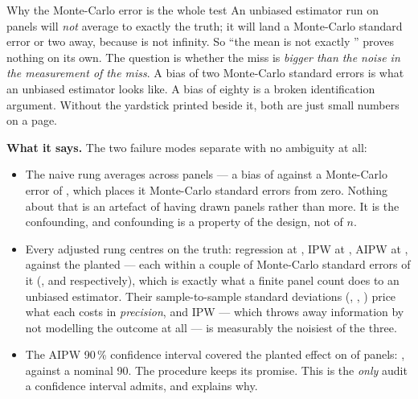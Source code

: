 \begin{intuition}{Why the Monte-Carlo error is the whole test}
An unbiased estimator run on \nbZeroNSeeds{} panels will \emph{not} average to exactly the
truth; it will land a Monte-Carlo standard error or two away, because \nbZeroNSeeds{} is not
infinity. So ``the mean is not exactly \eur{\nbZeroTrueDag}'' proves nothing on its own. The
question is whether the miss is \emph{bigger than the noise in the measurement of the miss}. A
bias of two Monte-Carlo standard errors is what an unbiased estimator looks like. A bias of
eighty is a broken identification argument. Without the yardstick printed beside it, both are
just small numbers on a page.
\end{intuition}

\textbf{What it says.} The two failure modes separate with no ambiguity at all:

\begin{itemize}[leftmargin=*]
  \item The naive rung averages \eur{\nbZeroMsNaiveMean} across panels --- a bias of
        \eur{\nbZeroMsNaiveBias} against a Monte-Carlo error of \eur{\nbZeroMsNaiveMcse}, which
        places it \nbZeroMsNaiveBiasInMcse{} Monte-Carlo standard errors from zero. Nothing about
        that is an artefact of having drawn \nbZeroNSeeds{} panels rather than more. It is the
        confounding, and confounding is a property of the design, not of $n$.
  \item Every adjusted rung centres on the truth: regression at \eur{\nbZeroMsRegMean}, IPW at
        \eur{\nbZeroMsIpwMean}, AIPW at \eur{\nbZeroMsAipwMean}, against the planted
        \eur{\nbZeroTrueDag} --- each within a couple of Monte-Carlo standard errors of it
        (\nbZeroMsRegBiasInMcse, \nbZeroMsIpwBiasInMcse{} and \nbZeroMsAipwBiasInMcse{}
        respectively), which is exactly what a finite panel count does to an unbiased estimator.
        Their sample-to-sample standard deviations (\eur{\nbZeroMsRegSd}, \eur{\nbZeroMsIpwSd},
        \eur{\nbZeroMsAipwSd}) price what each costs in \emph{precision}, and IPW --- which
        throws away information by not modelling the outcome at all --- is measurably the
        noisiest of the three.
  \item The AIPW 90\,\% confidence interval covered the planted effect on \nbZeroAipwCovered{}
        of \nbZeroNSeeds{} panels: \pc{\nbZeroAipwCovPct}, against a nominal 90. The procedure
        keeps its promise. This is the \emph{only} audit a confidence interval admits, and
         explains why.
\end{itemize}

